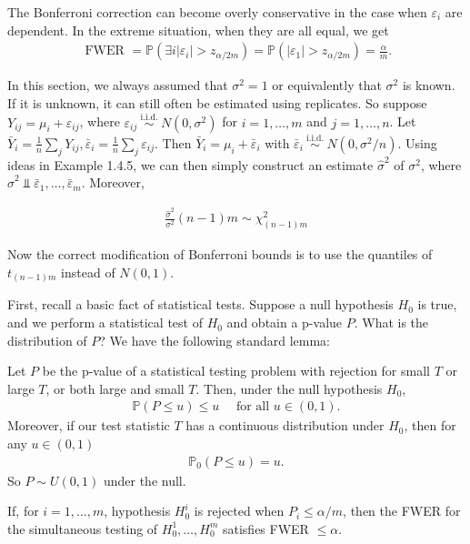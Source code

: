 The Bonferroni correction can become overly conservative in the case when $\varepsilon_i$ are dependent. In the extreme situation, when they are all equal, we get
\begin{align*}
\text { FWER }=\mathbb{P}\left(\exists i\left|\varepsilon_i\right|>z_{\alpha / 2 m}\right)=\mathbb{P}\left(\left|\varepsilon_1\right|>z_{\alpha / 2 m}\right)=\frac{\alpha}{m} .
\end{align*}

\begin{remark}
    In this section, we always assumed that $\sigma^2=1$ or equivalently that $\sigma^2$ is known. If it is unknown, it can still often be estimated using replicates. So suppose $Y_{i j}=\mu_i+\varepsilon_{i j}$, where $\varepsilon_{i j} \stackrel{\text { i.i.d. }}{\sim} N\left(0, \sigma^2\right)$ for $i=1, \ldots, m$ and $j=1, \ldots, n$. Let $\bar{Y}_i=\frac{1}{n} \sum_j Y_{i j}, \bar{\varepsilon}_i=\frac{1}{n} \sum_j \varepsilon_{i j}$. Then $\bar{Y}_i=\mu_i+\bar{\varepsilon}_i$ with $\bar{\varepsilon}_i \stackrel{\text { i.i.d. }}{\sim} N\left(0, \sigma^2 / n\right)$. Using ideas in Example 1.4.5, we can then simply construct an estimate $\hat{\sigma}^2$ of $\sigma^2$, where $\hat{\sigma}^2 \Perp \bar{\varepsilon}_1, \ldots, \bar{\varepsilon}_m$. Moreover,

\begin{align*}
\frac{\hat{\sigma}^2}{\sigma^2}(n-1) m \sim \chi_{(n-1) m}^2
\end{align*}


Now the correct modification of Bonferroni bounds is to use the quantiles of $t_{(n-1) m}$ instead of $N(0,1)$.
\end{remark}


First, recall a basic fact of statistical tests. Suppose a null hypothesis $H_0$ is true, and we perform a statistical test of $H_0$ and obtain a p-value $P$. What is the distribution of $P$? We have the following standard lemma:

\begin{lem}
Let $P$ be the p-value of a statistical testing problem with rejection for small $T$ or large $T$, or both large and small $T$. Then, under the null hypothesis $H_0$,
    \begin{align*}
\mathbb{P}(P \leq u) \leq u \quad \text { for all } u \in(0,1) .
\end{align*}
Moreover, if our test statistic $T$ has a continuous distribution under $H_0$, then for any $u \in(0,1)$
\begin{align*}
\mathbb{P}_0(P \leq u)=u .
\end{align*}
So $P \sim U(0,1)$ under the null.
\end{lem}
\begin{thm}
     If, for $i=1, \ldots, m$, hypothesis $H_0^i$ is rejected when $P_i \leq \alpha / m$, then the FWER for the simultaneous testing of $H_0^1, \ldots, H_0^m$ satisfies FWER $\leq \alpha$.
\end{thm}

